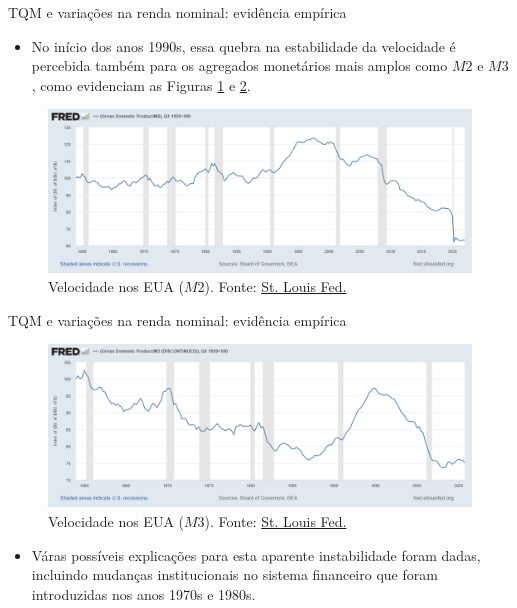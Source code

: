 \documentclass[10pt]{beamer}
\begin{document}
\begin{frame}{TQM e variações na renda nominal: evidência empírica}
    \begin{itemize}
        \item No início dos anos 1990s, essa quebra na estabilidade da velocidade é percebida também para os agregados monetários mais amplos como $M2$ e $M3$, como evidenciam as Figuras \ref{fig2} e \ref{fig3}.
    \end{itemize}
    \begin{figure}
        \centering
        \includegraphics[width=\textwidth]{./figures/aula10_fig2.png}
        \caption{Velocidade nos EUA ($M2$). Fonte: \href{https://fred.stlouisfed.org/graph/?g=PNQI}{St. Louis Fed.}}
        \label{fig2}
    \end{figure}
\end{frame}

\begin{frame}{TQM e variações na renda nominal: evidência empírica}
    \begin{figure}
        \centering
        \includegraphics[width=\textwidth]{./figures/aula10_fig3.png}
        \caption{Velocidade nos EUA ($M3$). Fonte: \href{https://fred.stlouisfed.org/graph/?g=PNRb}{St. Louis Fed.}}
        \label{fig3}
    \end{figure}
    \begin{itemize}
        \item Váras possíveis explicações para esta aparente instabilidade foram dadas, incluindo mudanças institucionais no sistema financeiro que foram introduzidas nos anos 1970s e 1980s.
    \end{itemize}
\end{frame}
\end{document}
